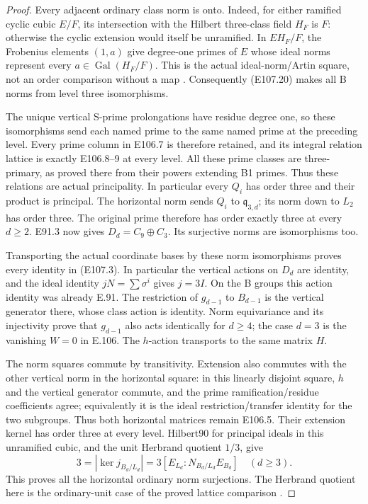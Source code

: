 \begin{proof}
Every adjacent ordinary class norm is onto. Indeed, for either
ramified cyclic cubic \(E/F\), its intersection with the Hilbert
three-class field \(H_F\) is \(F\): otherwise the cyclic extension
would itself be unramified. In \(EH_F/F\), the Frobenius elements
\((1,a)\) give degree-one primes of \(E\) whose ideal norms
represent every \(a\in\operatorname{Gal}(H_F/F)\).
This is the actual ideal-norm/Artin square, not an order comparison
without a map
\cite[V,Proposition3.3,Theorem3.6,Example3.9;
VIII,Theorem7.4]{E_MilneCFT}.
Consequently (E107.20) makes all B norms from level three
isomorphisms.

The unique vertical S-prime prolongations have residue degree one,
so these isomorphisms send each named prime to the same named
prime at the preceding level. Every prime column in E106.7 is
therefore retained, and its integral relation lattice is exactly
E106.8--9 at every level. All these prime classes are three-primary,
as proved there from their powers extending B1 primes.
Thus these relations are actual principality. In particular every
\(Q_i\) has order three and their product is principal.
The horizontal norm sends \(Q_i\) to \(\mathfrak q_{3,d}\);
its norm down to \(L_2\) has order three. The original prime
therefore has order exactly three at every \(d\ge2\).
E91.3 now gives \(D_d=C_9\oplus C_3\). Its surjective norms
are isomorphisms too.

Transporting the actual coordinate bases by these norm
isomorphisms proves every identity in (E107.3).
In particular the vertical actions on \(D_d\) are identity,
and the ideal identity \(jN=\sum\sigma^i\) gives \(j=3I\).
On the B groups this action identity was already E.91.
The restriction of \(g_{d-1}\) to \(B_{d-1}\) is the vertical
generator there, whose class action is identity. Norm equivariance
and its injectivity prove that \(g_{d-1}\) also acts identically
for \(d\ge4\); the case \(d=3\) is the vanishing \(W=0\) in E.106.
The \(h\)-action transports to the same matrix \(H\).

The norm squares commute by transitivity. Extension also commutes
with the other vertical norm in the horizontal square: in this
linearly disjoint square, \(h\) and the vertical generator commute,
and the prime ramification/residue coefficients agree; equivalently
it is the ideal restriction/transfer identity for the two subgroups.
Thus both horizontal matrices remain E106.5. Their extension
kernel has order three at every level. Hilbert90 for principal
ideals in this unramified cubic, and the unit Herbrand quotient
\(1/3\), give
\[
 3=|\ker j_{B_d/L_d}|
   =3[E_{L_d}:N_{B_d/L_d}E_{B_d}]\quad(d\ge3).
 \tag{E107.21}
\]
This proves all the horizontal ordinary norm surjections.
The Herbrand quotient here is the ordinary-unit case of the
proved lattice comparison
\cite[VII,Proposition3.1 and its complete proof]{E_MilneCFT}.


\end{proof}
